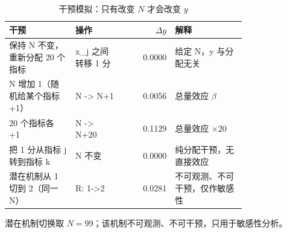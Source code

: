 \begin{table}[htbp]
\centering
\caption{干预模拟：只有改变 $N$ 才会改变 $y$}
\label{tab:intervention}
\small
\begin{tabular}{p{0.28\linewidth}p{0.20\linewidth}rp{0.30\linewidth}}
\toprule
干预 & 操作 & $\Delta y$ & 解释 \\
\midrule
保持 N 不变，重新分配 20 个指标 & x\_j 之间转移 1 分 & 0.0000 & 给定 N，y 与分配无关 \\
N 增加 1（随机给某个指标 +1） & N -> N+1 & 0.0056 & 总量效应 $\beta$ \\
20 个指标各 +1 & N -> N+20 & 0.1129 & 总量效应 ×20 \\
把 1 分从指标 j 转到指标 k & N 不变 & 0.0000 & 纯分配干预，无直接效应 \\
潜在机制从 1 切到 2（同一 N） & R: 1->2 & 0.0281 & 不可观测、不可干预，仅作敏感性 \\
\bottomrule
\end{tabular}
\par\vspace{2pt}\footnotesize 潜在机制切换取 $N=99$；该机制不可观测、不可干预，只用于敏感性分析。
\end{table}
